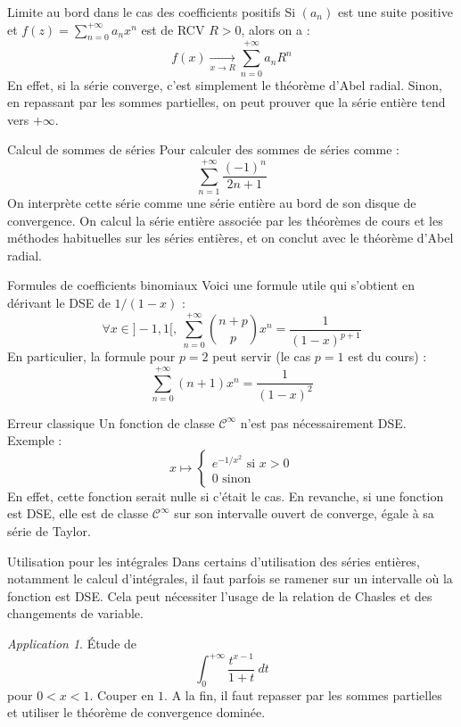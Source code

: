 \documentclass[french]{book}
\theoremstyle{plain}
\theoremstyle{definition}
\theoremstyle{remark}
\newtheorem*{app}{Application}
\begin{document}
\begin{AS}{Limite au bord dans le cas des coefficients positifs} Si $(a_n)$ est une suite positive et $f(z)=\displaystyle\sum_{n=0}^{+\infty}a_nx^n$ est de RCV $R>0$, alors on a : $$f(x)\xrightarrow[x\to R]{}\sum_{n=0}^{+\infty}a_nR^n$$ En effet, si la série converge, c'est simplement le théorème d'Abel radial. Sinon, en repassant par les sommes partielles, on peut  prouver que la série entière tend vers $+\infty$.
\end{AS}\begin{AS}{Calcul de sommes de séries} Pour calculer des sommes de séries comme : $$\sum_{n=1}^{+\infty}\frac{(-1)^n}{2n+1}$$ On interprète cette série comme une série entière au bord de son disque de convergence. On calcul la série entière associée par les théorèmes de cours et les méthodes habituelles sur les séries entières, et on conclut avec le théorème d'Abel radial.
\end{AS}\begin{AS}{Formules de coefficients binomiaux} Voici une formule utile qui s'obtient en dérivant le DSE de $1/(1-x)$ : $$\forall x\in]-1,1[,\ \sum_{n=0}^{+\infty}\binom{n+p}{p}x^n=\frac{1}{(1-x)^{p+1}}$$ En particulier, la formule pour $p=2$ peut servir (le cas $p=1$ est du cours) : $$\sum_{n=0}^{+\infty}(n+1)x^n=\frac{1}{(1-x)^2}$$
\end{AS}\begin{AS}{Erreur classique} Un fonction de classe $\mathcal{C}^{\infty}$ n'est pas nécessairement DSE. Exemple : $$x\mapsto\begin{cases} e^{-1/x^2}\text{ si } x>0 \\ 0 \text{ sinon}\end{cases}$$ En effet, cette fonction serait nulle si c'était le cas. En revanche, si une fonction est DSE, elle est de classe $\mathcal{C}^{\infty}$ sur son intervalle ouvert de converge, égale à sa série de Taylor.
\end{AS}\begin{AS}{Utilisation pour les intégrales} Dans certains d'utilisation des séries entières, notamment le calcul d'intégrales, il faut parfois se ramener sur un intervalle où la fonction est DSE. Cela peut nécessiter l'usage de la relation de Chasles et des changements de variable.
\end{AS}
\begin{app}
	Étude de $$\int_{0}^{+\infty}\frac{t^{x-1}}{1+t}\ dt$$ pour $0<x<1$. Couper en $1$. A la fin, il faut repasser par les sommes partielles et utiliser le théorème de convergence dominée.
\end{app}
\end{document}
